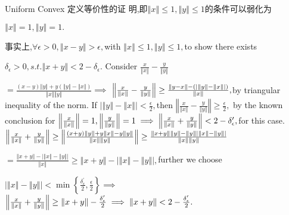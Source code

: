 \documentclass{article}
\begin{document}
Uniform Convex 定义等价性的证%
明,即$\left\Vert x\right\Vert \leq 1,\left\Vert y\right\Vert
\leq 1$的条件可以弱化为

$\left\Vert x\right\Vert =1,\left\Vert y\right\Vert =1.$

事实上,$\forall \epsilon >0,\left\Vert x-y\right\Vert
>\epsilon ,$with $\left\Vert x\right\Vert \leq 1,\left\Vert y\right\Vert
\leq 1,$to show there exists

$\delta _{\epsilon }>0,s.t.\left\Vert x+y\right\Vert <2-\delta _{\epsilon }.$
Consider $\frac{x}{\left\Vert x\right\Vert }-\frac{y}{\left\Vert
y\right\Vert }$

$=\frac{\left( x-y\right) \left\Vert y\right\Vert +y\left( \left\Vert
y\right\Vert -\left\Vert x\right\Vert \right) }{\left\Vert x\right\Vert
\left\Vert y\right\Vert }\implies $ $\left\Vert \frac{x}{\left\Vert
x\right\Vert }-\frac{y}{\left\Vert y\right\Vert }\right\Vert \geq \frac{%
\left\Vert y-x\right\Vert -\left( \left\vert \left\Vert y\right\Vert
-\left\Vert x\right\Vert \right\vert \right) }{\left\Vert x\right\Vert },$by
triangular inequality of the norm. If $\left\vert \left\Vert y\right\Vert
-\left\Vert x\right\Vert \right\vert <\frac{\epsilon }{2},$then $\left\Vert 
\frac{x}{\left\Vert x\right\Vert }-\frac{y}{\left\Vert y\right\Vert }%
\right\Vert \geq \frac{\epsilon }{2},$ by the known conclusion for $%
\left\Vert \frac{x}{\left\Vert x\right\Vert }\right\Vert =1,\left\Vert \frac{%
y}{\left\Vert y\right\Vert }\right\Vert =1\implies \left\Vert \frac{x}{%
\left\Vert x\right\Vert }+\frac{y}{\left\Vert y\right\Vert }\right\Vert
<2-\delta _{\epsilon }^{\prime },$for this case. $\left\Vert \frac{x}{%
\left\Vert x\right\Vert }+\frac{y}{\left\Vert y\right\Vert }\right\Vert \geq
\left\Vert \frac{\left( x+y\right) \left\Vert y\right\Vert +y\left\Vert
x\right\Vert -y\left\Vert y\right\Vert }{\left\Vert x\right\Vert \left\Vert
y\right\Vert }\right\Vert \geq \frac{\left\Vert x+y\right\Vert \left\Vert
y\right\Vert -\left\Vert y\right\Vert \left\vert \left\Vert x\right\Vert
-\left\Vert y\right\Vert \right\vert }{\left\Vert x\right\Vert \left\Vert
y\right\Vert }$

$=\frac{\left\Vert x+y\right\Vert -\left\vert \left\Vert x\right\Vert
-\left\Vert y\right\Vert \right\vert }{\left\Vert x\right\Vert }\geq
\left\Vert x+y\right\Vert -\left\vert \left\Vert x\right\Vert -\left\Vert
y\right\Vert \right\vert ,$further we choose

$\left\vert \left\Vert x\right\Vert -\left\Vert y\right\Vert \right\vert
<\min \left\{ \frac{\delta _{\epsilon }^{\prime }}{2},\frac{\epsilon }{2}%
\right\} \implies $ $\left\Vert \frac{x}{\left\Vert x\right\Vert }+\frac{y}{%
\left\Vert y\right\Vert }\right\Vert \geq \left\Vert x+y\right\Vert -\frac{%
\delta _{\epsilon }^{\prime }}{2}\implies \left\Vert x+y\right\Vert <2-\frac{%
\delta _{\epsilon }^{\prime }}{2}.$
\end{document}
